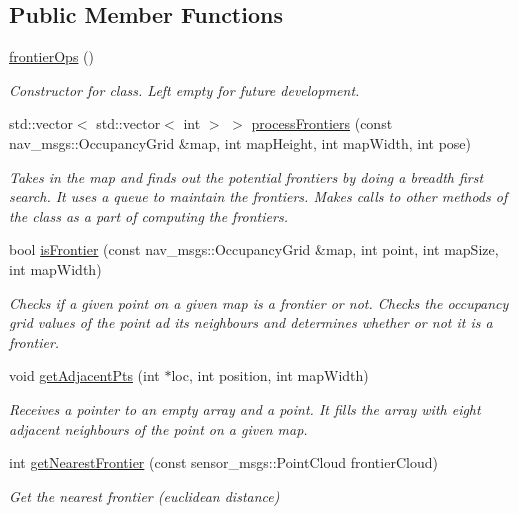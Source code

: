\subsection*{Public Member Functions}
\begin{DoxyCompactItemize}
\item 
\hyperlink{classfrontierOps_a8c0a23673e5f301bd3ced6bed48e9a68}{frontier\+Ops} ()
\begin{DoxyCompactList}\small\item\em Constructor for class. Left empty for future development. \end{DoxyCompactList}\item 
std\+::vector$<$ std\+::vector$<$ int $>$ $>$ \hyperlink{classfrontierOps_afccdd525011a5e5612e508b1cc3f970c}{process\+Frontiers} (const nav\+\_\+msgs\+::\+Occupancy\+Grid \&map, int map\+Height, int map\+Width, int pose)
\begin{DoxyCompactList}\small\item\em Takes in the map and finds out the potential frontiers by doing a breadth first search. It uses a queue to maintain the frontiers. Makes calls to other methods of the class as a part of computing the frontiers. \end{DoxyCompactList}\item 
bool \hyperlink{classfrontierOps_a7b683fae50c4177ff4a03a8d7f81135e}{is\+Frontier} (const nav\+\_\+msgs\+::\+Occupancy\+Grid \&map, int point, int map\+Size, int map\+Width)
\begin{DoxyCompactList}\small\item\em Checks if a given point on a given map is a frontier or not. Checks the occupancy grid values of the point ad its neighbours and determines whether or not it is a frontier. \end{DoxyCompactList}\item 
void \hyperlink{classfrontierOps_a50425855de4624cdd70b521e27a77306}{get\+Adjacent\+Pts} (int $\ast$loc, int position, int map\+Width)
\begin{DoxyCompactList}\small\item\em Receives a pointer to an empty array and a point. It fills the array with eight adjacent neighbours of the point on a given map. \end{DoxyCompactList}\item 
int \hyperlink{classfrontierOps_a1d13d033b937ae062daeeec85f7cde89}{get\+Nearest\+Frontier} (const sensor\+\_\+msgs\+::\+Point\+Cloud frontier\+Cloud)
\begin{DoxyCompactList}\small\item\em Get the nearest frontier (euclidean distance) \end{DoxyCompactList}\item 

\end{DoxyCompactItemize}
